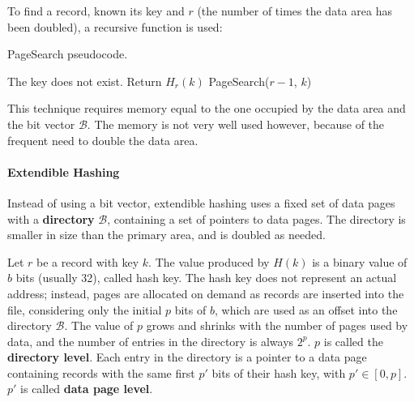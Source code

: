 To find a record, known its key and $r$ (the number of times the data area has been doubled), a recursive function is used:
\begin{algorithm}[ht]
\caption{PageSearch pseudocode.}
\begin{algorithmic}[1]
        \State The key does not exist.
        \State Return $H_r(k)$
    \Else
        \State PageSearch($r-1$, $k$)
    \EndIf
\end{algorithmic}
\end{algorithm}
This technique requires memory equal to the one occupied by the data area and the bit vector $\mathcal{B}$. The memory is not very well used however, because of the frequent need to double the data area.

\paragraph{Extendible Hashing}

Instead of using a bit vector, extendible hashing uses a fixed set of data pages with a \textbf{directory} $\mathcal{B}$, containing a set of pointers to data pages. The directory is smaller in size than the primary area, and is doubled as needed.

Let $r$ be a record with key $k$. The value produced by $H(k)$ is a binary value of $b$ bits (usually 32), called hash key. The hash key does not represent an actual address; instead, pages are allocated on demand as records are inserted into the file, considering only the initial $p$ bits of $b$, which are used as an offset into the directory $\mathcal{B}$. The value of $p$ grows and shrinks with the number of pages used by data, and the number of entries in the directory is always $2^p$. $p$ is called the \textbf{directory level}. Each entry in the directory is a pointer to a data page containing records with the same first $p'$ bits of their hash key, with $p' \in [0, p]$. $p'$ is called \textbf{data page level}.

